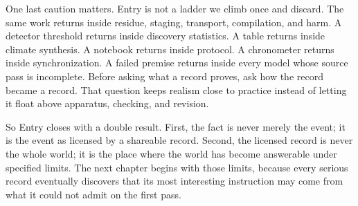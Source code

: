 \begin{movementclose}
One last caution matters. Entry is not a ladder we climb once and discard. The
same work returns inside residue, staging, transport, compilation, and harm. A
detector threshold returns inside discovery statistics. A table returns inside
climate synthesis. A notebook returns inside protocol. A chronometer returns
inside synchronization. A failed premise returns inside every model whose
source pass is incomplete. Before asking what a record proves, ask how the
record became a record. That question keeps realism close to practice instead
of letting it float above apparatus, checking, and revision.

So Entry closes with a double result. First, the fact is never merely the event;
it is the event as licensed by a shareable record. Second, the licensed record
is never the whole world; it is the place where the world has become answerable
under specified limits. The next chapter begins with those limits, because
every serious record eventually discovers that its most interesting instruction
may come from what it could not admit on the first pass.
\end{movementclose}
